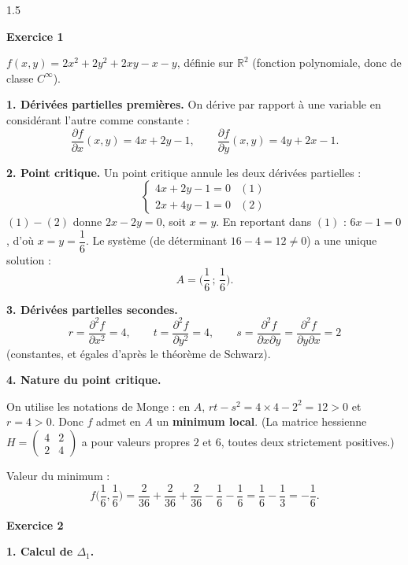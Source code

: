 \documentclass[12pt]{article}
\begin{document}
\begin{spacing}{1.5}

\textbf{Exercice 1}

$f(x,y)=2x^2+2y^2+2xy-x-y$, définie sur $\mathbb{R}^2$ (fonction polynomiale, donc de classe $C^\infty$).

\textbf{1. Dérivées partielles premières.} On dérive par rapport à une variable en considérant l'autre comme constante :
\[
\frac{\partial f}{\partial x}(x,y)=4x+2y-1,\qquad \frac{\partial f}{\partial y}(x,y)=4y+2x-1 .
\]

\textbf{2. Point critique.} Un point critique annule les deux dérivées partielles :
\[
\begin{cases}
4x+2y-1=0 & (1)\\
2x+4y-1=0 & (2)
\end{cases}
\]
$(1)-(2)$ donne $2x-2y=0$, soit $x=y$. En reportant dans $(1)$ : $6x-1=0$, d'où $x=y=\dfrac16$. Le système (de déterminant $16-4=12\neq0$) a une unique solution :
\[
\boxed{A=\Big(\frac16\,;\,\frac16\Big)}.
\]

\textbf{3. Dérivées partielles secondes.}
\[
r=\frac{\partial^2f}{\partial x^2}=4,\qquad t=\frac{\partial^2 f}{\partial y^2}=4,\qquad s=\frac{\partial^2 f}{\partial x\partial y}=\frac{\partial^2 f}{\partial y\partial x}=2
\]
(constantes, et égales d'après le théorème de Schwarz).

\textbf{4. Nature du point critique.}

On utilise les notations de Monge : en $A$, $rt-s^2=4\times4-2^2=12>0$ et $r=4>0$. Donc $f$ admet en $A$ un \textbf{minimum local}. (La matrice hessienne $H=\begin{pmatrix}4&2\\2&4\end{pmatrix}$ a pour valeurs propres $2$ et $6$, toutes deux strictement positives.)

Valeur du minimum :
\[
f\Big(\frac16,\frac16\Big)=\frac{2}{36}+\frac{2}{36}+\frac{2}{36}-\frac16-\frac16=\frac16-\frac13=-\frac16 .
\]


\medskip\textbf{Exercice 2}

\textbf{1. Calcul de $\Delta_1$.}


\end{spacing}
\end{document}
